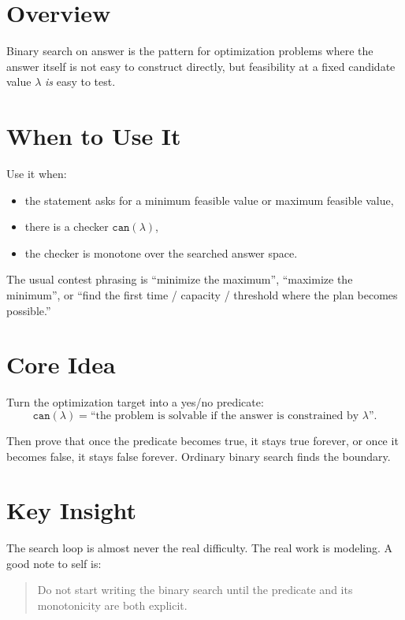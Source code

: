 \section*{Overview}

Binary search on answer is the pattern for optimization problems where the answer itself is not easy to construct
directly, but feasibility at a fixed candidate value \(\lambda\) \emph{is} easy to test.

\section*{When to Use It}

Use it when:

\begin{itemize}
  \item the statement asks for a minimum feasible value or maximum feasible value,
  \item there is a checker \(\texttt{can}(\lambda)\),
  \item the checker is monotone over the searched answer space.
\end{itemize}

The usual contest phrasing is ``minimize the maximum'', ``maximize the minimum'', or ``find the first time / capacity /
threshold where the plan becomes possible.''

\section*{Core Idea}

Turn the optimization target into a yes/no predicate:
\[
\texttt{can}(\lambda) = \text{``the problem is solvable if the answer is constrained by } \lambda \text{''}.
\]

Then prove that once the predicate becomes true, it stays true forever, or once it becomes false, it stays false
forever. Ordinary binary search finds the boundary.

\section*{Key Insight}

The search loop is almost never the real difficulty. The real work is modeling. A good note to self is:

\begin{quote}
Do not start writing the binary search until the predicate and its monotonicity are both explicit.
\end{quote}

